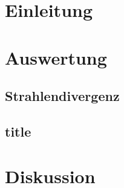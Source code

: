 \section{Einleitung}

\newpage
\section{Auswertung}

\subsection{Strahlendivergenz}

\subsection{title}
\newpage
\section{Diskussion} 
